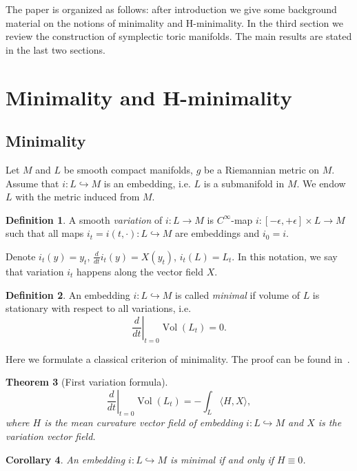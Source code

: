 \documentclass[jsg]{IP_v1_forauthors}
\def\Vol{\mathop{\mathrm{Vol}}}
\newtheorem{theo}{Theorem}[section]
\newtheorem{coro}[theo]{Corollary}
\theoremstyle{definition}
\newtheorem{defi}[theo]{Definition}
\newtheorem{rema}[theo]{Remark}
\numberwithin{equation}{section}
\begin{document}
The paper is organized as follows: after introduction we give some background material on the notions of minimality and H-minimality. In the third section we
review the construction of symplectic toric manifolds. The main results are stated in the last two sections.

\section{Minimality and H-minimality}

\subsection{Minimality}


Let $M$ and $L$ be smooth compact manifolds, $g$ be a Riemannian metric on $M$. Assume that $i:L \hookrightarrow M$ is an embedding, i.e. $L$ is a submanifold in $M$. We endow $L$ with the metric induced from $M$.

\begin{defi}
A smooth {\itshape variation} of $i \colon L \to M$ is $C^{\infty}$-map $i:[-\epsilon,+\epsilon]\times L \rightarrow M$ such that all maps $i_t = i(t,\cdot):L \hookrightarrow M$ are embeddings and $i_0 =i$.
\end{defi}

Denote $i_t(y)=y_t$, $ \frac d {dt} i_t(y)= X(y_t)$, $i_t(L)=L_t$. In this notation, we say that variation $i_t$ happens along the vector field $X$.
\begin{defi}
An embedding $i: L \hookrightarrow M$ is called {\itshape minimal} if volume of $L$ is stationary with respect to all variations, i.e.
\begin{equation} 
\left. \frac d{dt} \right |_{t=0} \Vol(L_t) = 0.
\end{equation}
\end{defi}

Here we formulate a classical criterion of minimality. The proof can be found in~\cite[Theorem~4]{L}.
\begin{theo}[First variation formula]
\begin{equation}
\left. \frac d{dt} \right |_{t=0} \Vol(L_t) = - \int_L \langle H, X \rangle, 
\end{equation}
where $H$ is the mean curvature vector field of embedding $i: L \hookrightarrow M$ and $X$ is the variation vector field.
\end{theo}
\begin{coro}
An embedding $i:L \hookrightarrow M$ is minimal if and only if $H \equiv 0$.
\end{coro}
\end{document}
